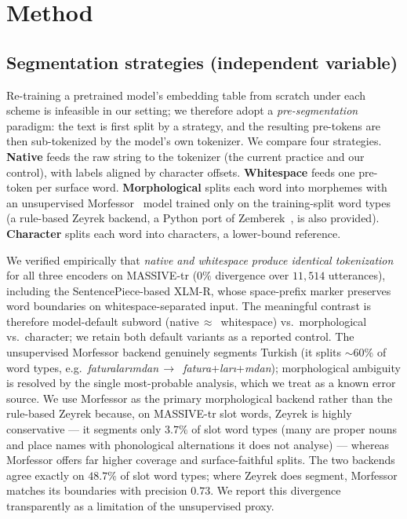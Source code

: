 \documentclass[runningheads]{llncs}
\begin{document}
\section{Method}
\subsection{Segmentation strategies (independent variable)}
Re-training a pretrained model's embedding table from scratch under each scheme
is infeasible in our setting; we therefore adopt a \emph{pre-segmentation}
paradigm: the text is first split by a strategy, and the resulting pre-tokens are
then sub-tokenized by the model's own tokenizer. We compare four strategies.
\textbf{Native} feeds the raw string to the tokenizer (the current practice and
our control), with labels aligned by character offsets. \textbf{Whitespace} feeds
one pre-token per surface word. \textbf{Morphological} splits each word into
morphemes with an unsupervised Morfessor~\cite{virpioja2013morfessor} model
trained only on the training-split word types (a rule-based Zeyrek backend, a
Python port of Zemberek~\cite{akin2007zemberek}, is also provided).
\textbf{Character} splits each word into characters, a lower-bound reference.

We verified empirically that \emph{native and whitespace produce identical
tokenization} for all three encoders on MASSIVE-tr ($0\%$ divergence over
$11{,}514$ utterances), including the SentencePiece-based XLM-R, whose
space-prefix marker preserves word boundaries on whitespace-separated input. The
meaningful contrast is therefore model-default subword (native\,$\approx$\,
whitespace) vs.\ morphological vs.\ character; we retain both default variants as
a reported control. The unsupervised Morfessor backend genuinely segments Turkish
(it splits $\sim$60\% of word types, e.g.\ \emph{faturalarımdan}\,$\rightarrow$\,
\emph{fatura}+\emph{ları}+\emph{mdan}); morphological ambiguity is resolved by the
single most-probable analysis, which we treat as a known error source. We use
Morfessor as the primary morphological backend rather than the rule-based Zeyrek
because, on MASSIVE-tr slot words, Zeyrek is highly conservative --- it segments
only $3.7\%$ of slot word types (many are proper nouns and place names with
phonological alternations it does not analyse) --- whereas Morfessor offers far
higher coverage and surface-faithful splits. The two backends agree exactly on
$48.7\%$ of slot word types; where Zeyrek does segment, Morfessor matches its
boundaries with precision $0.73$. We report this divergence transparently as a
limitation of the unsupervised proxy.
\end{document}
